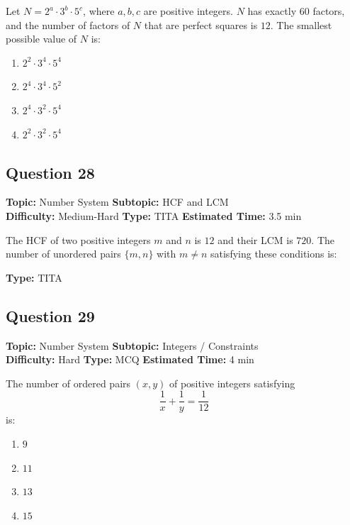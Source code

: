 \documentclass[11pt]{article}
\begin{document}
\begin{tcolorbox}
Let \(N = 2^{a} \cdot 3^{b} \cdot 5^{c}\), where \(a, b, c\) are positive integers. \(N\) has exactly \(60\) factors, and the number of factors of \(N\) that are perfect squares is \(12\). The smallest possible value of \(N\) is:
\end{tcolorbox}

\begin{enumerate}[label=(\Alph*)]
    \item \(2^{2} \cdot 3^{4} \cdot 5^{4}\)
    \item \(2^{4} \cdot 3^{4} \cdot 5^{2}\)
    \item \(2^{4} \cdot 3^{2} \cdot 5^{4}\)
    \item \(2^{2} \cdot 3^{2} \cdot 5^{4}\)
\end{enumerate}

\subsection*{Question 28}
\textbf{Topic:} Number System \quad \textbf{Subtopic:} HCF and LCM \\
\textbf{Difficulty:} Medium-Hard \quad \textbf{Type:} TITA \quad \textbf{Estimated Time:} 3.5 min

\begin{tcolorbox}
The HCF of two positive integers \(m\) and \(n\) is \(12\) and their LCM is \(720\). The number of unordered pairs \(\{m, n\}\) with \(m \ne n\) satisfying these conditions is:
\end{tcolorbox}

\textbf{Type:} TITA

\subsection*{Question 29}
\textbf{Topic:} Number System \quad \textbf{Subtopic:} Integers / Constraints \\
\textbf{Difficulty:} Hard \quad \textbf{Type:} MCQ \quad \textbf{Estimated Time:} 4 min

\begin{tcolorbox}
The number of ordered pairs \((x, y)\) of positive integers satisfying
\[
\frac{1}{x} + \frac{1}{y} = \frac{1}{12}
\]
is:
\end{tcolorbox}

\begin{enumerate}[label=(\Alph*)]
    \item \(9\)
    \item \(11\)
    \item \(13\)
    \item \(15\)
\end{enumerate}
\end{document}
